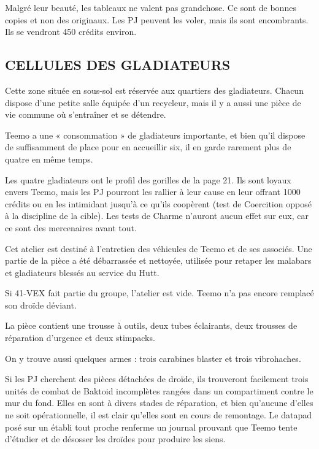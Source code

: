 \documentclass[a4paper,10pt,twoside,twocolumn,openany]{book}
\begin{document}
Malgré leur beauté, les tableaux ne valent pas grandchose. Ce sont de bonnes copies et non des originaux.
Les PJ peuvent les voler, mais ils sont encombrants. Ils se
vendront 450 crédits environ.

\subsection{CELLULES DES GLADIATEURS}

Cette zone située en sous-sol est réservée aux quartiers
des gladiateurs. Chacun dispose d’une petite salle équipée d’un recycleur, mais il y a aussi une pièce de vie commune où s’entraîner et se détendre.

Teemo a une « consommation » de gladiateurs importante, et bien qu’il dispose de suffisamment de place
pour en accueillir six, il en garde rarement plus de quatre
en même temps.

Les quatre gladiateurs ont le profil des gorilles de la
page 21. Ils sont loyaux envers Teemo, mais les PJ pourront les rallier à leur cause en leur offrant 1000 crédits
ou en les intimidant jusqu’à ce qu’ils coopèrent (test de
Coercition opposé à la discipline de la cible). Les tests
de Charme n’auront aucun effet sur eux, car ce sont des
mercenaires avant tout.


\subtitle{ATELIER ET ZONE DE DÉCHARGEMENT}
Cet atelier est destiné à l’entretien des véhicules de Teemo et de ses associés. Une partie de la pièce a été débarrassée et nettoyée, utilisée pour retaper les malabars
et gladiateurs blessés au service du Hutt.

Si 41-VEX fait partie du groupe, l’atelier est vide. Teemo n’a pas encore remplacé son droïde déviant.

La pièce contient une trousse à outils, deux tubes
éclairants, deux trousses de réparation d’urgence et
deux stimpacks.

On y trouve aussi quelques armes : trois carabines
blaster et trois vibrohaches.

Si les PJ cherchent des pièces détachées de droïde,
ils trouveront facilement trois unités de combat de Baktoid incomplètes rangées dans un compartiment contre
le mur du fond. Elles en sont à divers stades de réparation, et bien qu’aucune d’elles ne soit opérationnelle,
il est clair qu’elles sont en cours de remontage. Le datapad posé sur un établi tout proche renferme un journal
prouvant que Teemo tente d’étudier et de désosser les
droïdes pour produire les siens.

\subtitle{CUISINE ET ZONE DE STOCKAGE}
\end{document}
